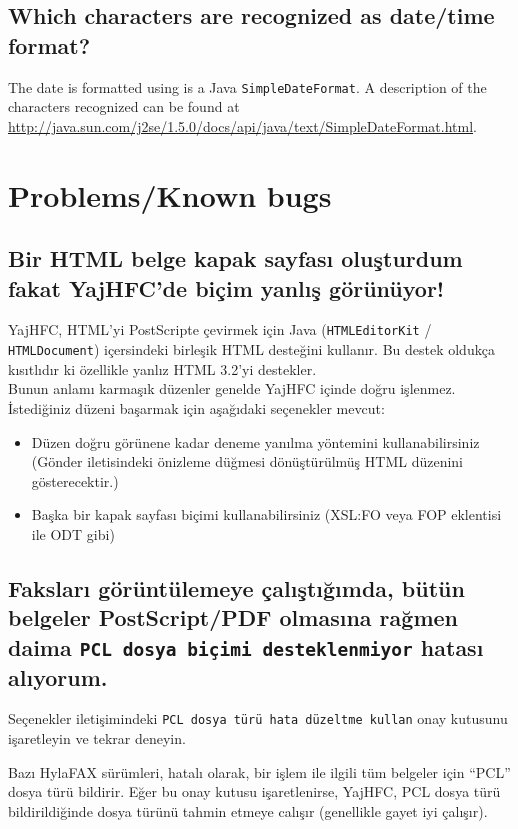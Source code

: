 \documentclass[a4paper,10pt]{scrartcl}
\begin{document}
\subsection{Which characters are recognized as date/time format?}

The date is formatted using is a Java \texttt{SimpleDateFormat}. A description of the characters recognized can be found at \url{http://java.sun.com/j2se/1.5.0/docs/api/java/text/SimpleDateFormat.html}.

\section{Problems/Known bugs}

\subsection{Bir HTML belge kapak sayfası oluşturdum fakat YajHFC'de biçim yanlış görünüyor!}

YajHFC, HTML'yi PostScripte çevirmek için Java (\texttt{HTMLEditorKit} / \texttt{HTMLDocument}) içersindeki birleşik HTML desteğini kullanır. Bu destek oldukça kısıtlıdır ki özellikle yanlız HTML 3.2'yi destekler.\\
Bunun anlamı karmaşık düzenler genelde YajHFC içinde doğru işlenmez.
İstediğiniz düzeni başarmak için aşağıdaki seçenekler mevcut:

\begin{itemize}
 \item Düzen doğru görünene kadar deneme yanılma yöntemini kullanabilirsiniz (Gönder iletisindeki önizleme düğmesi dönüştürülmüş HTML düzenini gösterecektir.)
 \item Başka bir kapak sayfası biçimi kullanabilirsiniz (XSL:FO veya FOP eklentisi ile ODT gibi)
\end{itemize}

\subsection{Faksları görüntülemeye çalıştığımda, bütün belgeler PostScript/PDF olmasına rağmen daima 
   \texttt{PCL dosya biçimi desteklenmiyor} hatası alıyorum.}

Seçenekler iletişimindeki \texttt{PCL dosya türü hata düzeltme kullan} onay kutusunu işaretleyin ve tekrar deneyin.

Bazı HylaFAX sürümleri, hatalı olarak, bir işlem ile ilgili tüm belgeler için
``PCL'' dosya türü bildirir. Eğer bu onay kutusu işaretlenirse, YajHFC, 
PCL dosya türü bildirildiğinde dosya türünü tahmin etmeye calışır (genellikle gayet iyi çalışır). 
\end{document}
